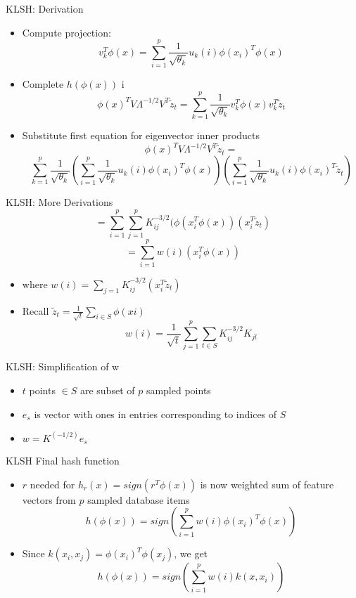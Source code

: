 \documentclass[12pt,a4paper]{beamer}
\begin{document}
\begin{frame}{KLSH: Derivation}
\begin{itemize}
\item Compute projection:
$$ v_{k}^{T} \phi (x) = \sum_{i=1}^{p}  \frac{1}{ \sqrt{ \theta_{k} } } u_{k}(i) \phi (x_{i})^{T} \phi (x)  $$
\item Complete $h(\phi (x))$ i$$ \phi(x)^{T} V \Lambda^{-1/2} V^{T} \tilde z_{t} = \sum_{k=1}^{p} \frac{1}{\sqrt{\theta_{k}}} v_{k}^{T} \phi(x) v_{k}^{T} \tilde z_{t} $$
\item Substitute first equation for eigenvector inner products
$$ \phi(x)^{T} V \Lambda^{-1/2} V^{T} \tilde z_{t} = $$
$$\sum_{k=1}^{p} \frac{1}{\sqrt{\theta_{k}}} 
(\sum_{i=1}^{p} \frac{1}{ \sqrt{\theta_{k}} } u_{k}(i) \phi (x_{i})^{T} \phi (x) )
(\sum_{i=1}^{p} \frac{1}{ \sqrt{\theta_{k}} } u_{k}(i) \phi (x_{i})^{T} \tilde z_{t}  )
$$
\end{itemize}
\end{frame}

\begin{frame}{KLSH: More Derivations}
$$ = \sum_{i=1}^{p}\sum_{j=1}^{p} K_{ij}^{-3/2}(\phi ( x_{i}^{T} \phi (x) ) (  x_{i}^{T} \tilde z_{t}  ) $$
$$ = \sum_{i=1}^{p} w(i) (  x_{i}^{T} \phi (x) ) $$
\begin{itemize}
\item where $w(i) = \sum_{j=1} K_{ij}^{-3/2} (  x_{i}^{T} \tilde z_{t}) $
\item Recall $\tilde z_{t} = \frac{1} {\sqrt{t}} \sum_{i \in S}{\phi (xi)} $
$$w(i) = \frac{1}{\sqrt{t}}\sum_{j=1}^{p}\sum_{t \in S} K_{ij}^{-3/2} K_{jl} $$
\end{itemize}
\end{frame}





\begin{frame}{KLSH: Simplification of w }
\begin{itemize}
\item $t$ points $\in S$ are subset of $p$ sampled points
\item $e_s$ is vector with ones in entries corresponding to indices of $S$
\item $w = K^{(-1/2)} e_s$
\end{itemize}
\end{frame}



\begin{frame}{KLSH Final hash function}
\begin{itemize}
\item $r$ needed for $h_r(x)=sign(r^T\phi(x))$ is now weighted sum of feature vectors from $p$ sampled database items
$$h(\phi(x)) = sign(\sum_{i=1}^{p}w(i)\phi(x_{i})^{T}\phi(x))$$
\item Since $k(x_i,x_j) = \phi(x_{i})^{T}\phi(x_{j}) $, we get
$$h(\phi(x)) = sign(\sum_{i=1}^{p}w(i)k(x,x_{i}))$$
\end{itemize}
\end{frame}
\end{document}
